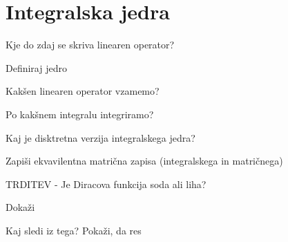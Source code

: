 \documentclass{article}
\begin{document}
    \section{Integralska jedra}
    \begin{enumerate}
        {\color{red}\item Kje do zdaj se skriva linearen operator?}
        {\color{red}\item Definiraj jedro}
        {\color{red}\item Kakšen linearen operator vzamemo?}
        \item Po kakšnem integralu integriramo?
        \item Kaj je disktretna verzija integralskega jedra?
        \item Zapiši ekvavilentna matrična zapisa (integralskega in matričnega)
        \item TRDITEV - Je Diracova funkcija soda ali liha? 
        {\color{red}\item Dokaži}
        \item {\color{red}Kaj sledi iz tega?} Pokaži, da res
    \end{enumerate}
\end{document}
